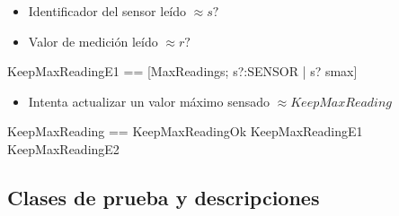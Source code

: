 
\begin{itemize}
  \item Identificador del sensor leído $\approx s?$ \\
  \item Valor de medición leído $\approx r?$ \\
\end{itemize}


\begin{zed}
KeepMaxReadingE1 == [\Xi MaxReadings; s?:SENSOR | s? \notin \dom smax]
\end{zed}


\begin{itemize}
  \item Intenta actualizar un valor máximo sensado $\approx KeepMaxReading$
\end{itemize}

\begin{zed}
KeepMaxReading == KeepMaxReadingOk \lor KeepMaxReadingE1 \lor KeepMaxReadingE2
\end{zed}

\subsection*{Clases de prueba y descripciones}


